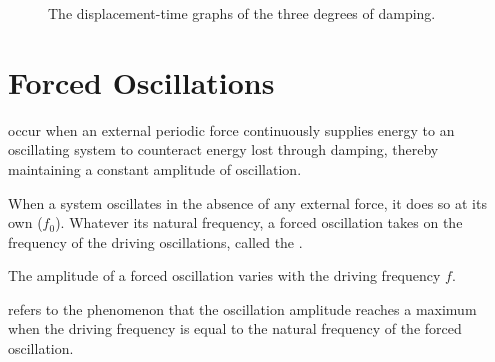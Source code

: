 \begin{figure}[H]
    \centering
    \caption{The displacement-time graphs of the three degrees of damping.}
\end{figure}

\section{Forced Oscillations}

\begin{definition}
     occur when an external periodic force continuously supplies energy to an oscillating system to counteract energy lost through damping, thereby maintaining a constant amplitude of oscillation.
\end{definition}

When a system oscillates in the absence of any external force, it does so at its own  ($f_0$). Whatever its natural frequency, a forced oscillation takes on the frequency of the driving oscillations, called the .

The amplitude of a forced oscillation varies with the driving frequency $f$.

\begin{definition}
     refers to the phenomenon that the oscillation amplitude reaches a maximum when the driving frequency is equal to the natural frequency of the forced oscillation.
\end{definition}

